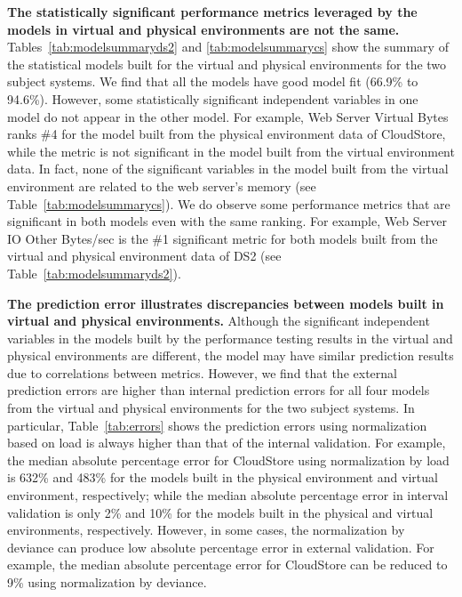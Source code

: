 \documentclass[smallextended]{svjour3}       %
\begin{document}
\noindent \textbf{The statistically significant performance metrics leveraged by the models in virtual and physical environments are not the same.} Tables~\ref{tab:modelsummaryds2} and \ref{tab:modelsummarycs} show the summary of the statistical models built for the virtual and physical environments for the two subject systems. We find that all the models have good model fit (66.9\% to 94.6\%). However, some statistically significant independent variables in one model do not appear in the other model. For example, Web Server Virtual Bytes ranks \#4 for the model built from the physical environment data of CloudStore, while the metric is not significant in the model built from the virtual environment data. In fact, none of the significant variables in the model built from the virtual environment are related to the web server's memory (see Table~\ref{tab:modelsummarycs}). We do observe some performance metrics that are significant in both models even with the same ranking. For example, Web Server IO Other Bytes/sec is the \#1 significant metric for both models built from the virtual and physical environment data of DS2 (see Table~\ref{tab:modelsummaryds2}). 

\noindent \textbf{The prediction error illustrates discrepancies between models built in virtual and physical environments.} Although the significant independent variables in the models built by the performance testing results in the virtual and physical environments are different, the model may have similar prediction results due to correlations between metrics. However, we find that the external prediction errors are higher than internal prediction errors for all four models from the virtual and physical environments for the two subject systems. In particular, Table~\ref{tab:errors} shows the prediction errors using normalization based on load is always higher than that of the internal validation. For example, the median absolute percentage error for CloudStore using normalization by load is 632\% and 483\% for the models built in the physical environment and virtual environment, respectively; while the median absolute percentage error in interval validation is only 2\% and 10\% for the models built in the physical and virtual environments, respectively. However, in some cases, the normalization by deviance can produce low absolute percentage error in external validation. For example, the median absolute percentage error for CloudStore can be reduced to 9\% using normalization by deviance. 
\end{document}
